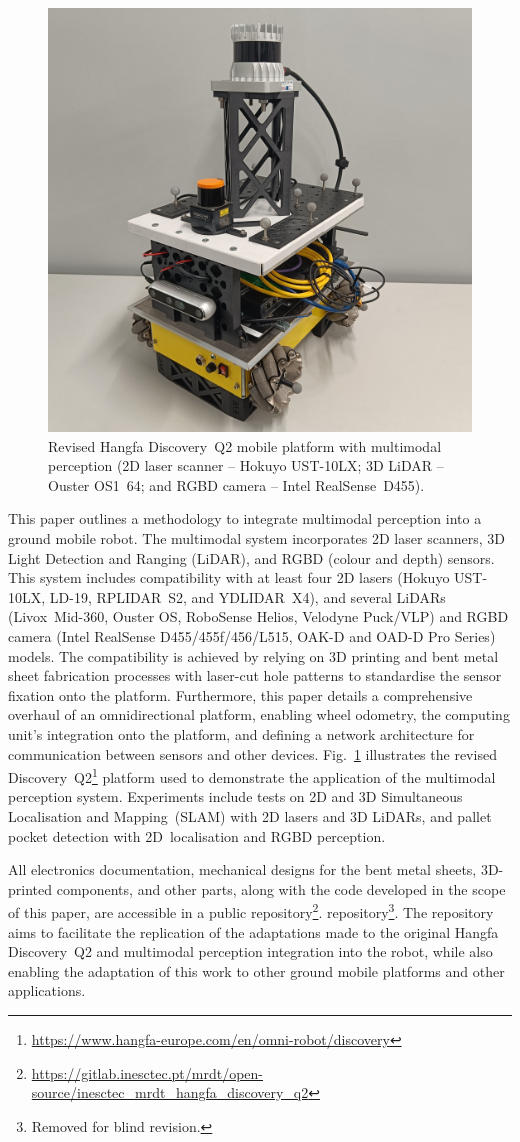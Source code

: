 \documentclass[letterpaper,10pt,conference]{IEEEtran} %
\def\figref#1{Fig.~\ref{#1}}
\def\finalversion{}
\begin{document}
\begin{figure}[t]
\centering
\includegraphics[width=0.5\columnwidth]{figs/hangfa-discovery-q2_revised-platform_photo_perspective_square.jpg}
\caption{Revised Hangfa Discovery~Q2
mobile platform
with multimodal perception
(2D laser scanner -- Hokuyo UST-10LX; 3D LiDAR -- Ouster OS1~64;
and RGBD camera -- Intel RealSense~D455).}
\label{fig:hangfa:revised-platform}
\end{figure}

This paper outlines a methodology to integrate multimodal perception
into a ground mobile robot. The multimodal system incorporates
2D laser scanners, 3D Light Detection and Ranging (LiDAR), and
RGBD (colour and depth) sensors. This system includes
compatibility with at least four 2D lasers
(Hokuyo UST-10LX, LD-19, RPLIDAR~S2, and YDLIDAR~X4),
and several LiDARs (Livox~Mid-360, Ouster OS, RoboSense Helios,
Velodyne Puck/VLP) and RGBD camera
(Intel RealSense D455/455f/456/L515, OAK-D and OAD-D Pro Series) models.
The compatibility is achieved by relying on 3D printing and
bent metal sheet fabrication processes with laser-cut hole patterns
to standardise the sensor fixation onto the platform.
Furthermore, this paper details a comprehensive overhaul of an
omnidirectional platform, enabling wheel odometry,
the computing unit's integration onto the platform,
and defining a network architecture
for communication between sensors and other devices.
\figref{fig:hangfa:revised-platform} illustrates the
revised Discovery~Q2\footnote{\url{https://www.hangfa-europe.com/en/omni-robot/discovery}}
platform used to demonstrate the application of the
multimodal perception system.
Experiments include tests
on 2D and 3D Simultaneous Localisation and Mapping~(SLAM)
with 2D lasers and 3D LiDARs, and pallet pocket detection
with 2D~localisation and RGBD perception.

All electronics documentation,
mechanical designs for the bent metal sheets,
3D-printed components, and other parts,
along with the code developed in the scope of this paper,
are accessible in a public
\ifdefined\finalversion%
repository\footnote{\label{note:repo}\url{https://gitlab.inesctec.pt/mrdt/open-source/inesctec_mrdt_hangfa_discovery_q2}}.
\else%
repository\footnote{\label{note:repo}Removed for blind revision.}.
\fi
The repository aims to facilitate the replication of the
adaptations made to the original Hangfa Discovery~Q2 and
multimodal perception integration into the robot,
while also enabling the adaptation of this work to 
other ground mobile platforms and other applications.
\end{document}
